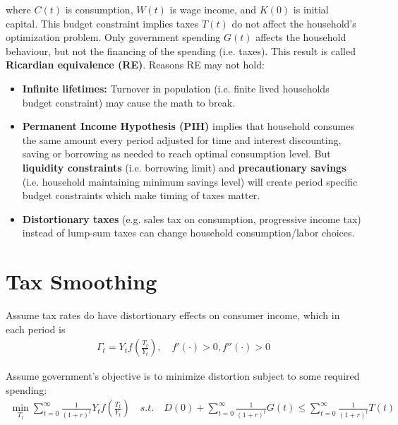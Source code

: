 \documentclass[main.tex]{subfiles}
\begin{document}
        where $C(t)$ is consumption, $W(t)$ is wage income, and $K(0)$ is initial capital. This budget constraint implies taxes $T(t)$ do not affect the household's optimization problem. Only government spending $G(t)$ affects the household behaviour, but not the financing of the spending (i.e. taxes). This result is called \textbf{Ricardian equivalence (RE)}. Reasons RE may not hold:
        \begin{itemize}
            \item
            \textbf{Infinite lifetimes:} Turnover in population (i.e. finite lived households budget constraint) may cause the math to break.
            
            \item
            \textbf{Permanent Income Hypothesis (PIH)} implies that household consumes the same amount every period adjusted for time and interest discounting, saving or borrowing as needed to reach optimal consumption level. But \textbf{liquidity constraints} (i.e. borrowing limit) and \textbf{precautionary savings} (i.e. household maintaining minimum savings level) will create period specific budget constraints which make timing of taxes matter.
            
            \item
            \textbf{Distortionary taxes} (e.g. sales tax on consumption, progressive income tax) instead of lump-sum taxes can change household consumption/labor choices.
            
        \end{itemize}
        
        
        \section{Tax Smoothing}
        
        Assume tax rates do have distortionary effects on consumer income, which in each period is
        \begin{align}
            \Gamma_t = Y_t f\left(\frac{T_t}{Y_t}\right),
            \quad
            f'(\cdot) > 0,  f''(\cdot) > 0
        \end{align}
        
        Assume government's objective is to minimize distortion subject to some required spending:
        \begin{align}
            \min_{T_t}
            \sum_{t=0}^\infty
            \frac{1}{(1+r)^t}
            Y_t f\left(\frac{T_t}{Y_t}\right)
            \quad s.t. \quad
            D(0) + \sum_{t=0}^\infty \frac{1}{(1+r)^t} G(t)
            \le
            \sum_{t=0}^\infty \frac{1}{(1+r)^t} T(t)
        \end{align}
        
\end{document}
